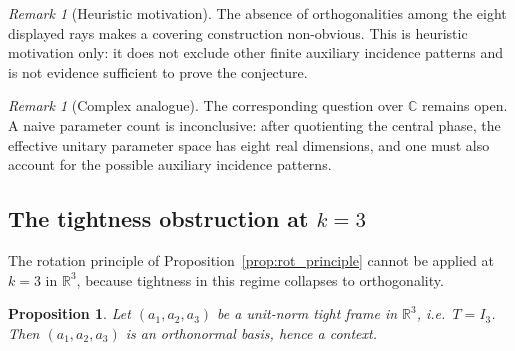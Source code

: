 \documentclass[
  twocolumn,
  aps,
  pra,
  floatfix,
  amsmath,amssymb,
  longbibliography
]{revtex4-2}
\newtheorem{proposition}[theorem]{Proposition}
\theoremstyle{definition}
\theoremstyle{remark}
\newtheorem{remark}[theorem]{Remark}
\begin{document}
\begin{remark}[Heuristic motivation]

The absence of orthogonalities among the eight displayed rays makes a
covering construction non-obvious.  This is heuristic motivation only:
it does not exclude other finite auxiliary incidence patterns and is not
evidence sufficient to prove the conjecture.
\end{remark}

\begin{remark}[Complex analogue]
The corresponding question over $\mathbb C$ remains open.  A naive
parameter count is inconclusive: after quotienting the central phase,
the effective unitary parameter space has eight real dimensions, and
one must also account for the possible auxiliary incidence patterns.
\end{remark}

\subsection{The tightness obstruction at \texorpdfstring{$k=3$}{k=3}}

The rotation principle of Proposition~\ref{prop:rot_principle}
cannot be applied at $k=3$ in $\mathbb{R}^3$, because tightness in
this regime collapses to orthogonality.

\begin{proposition}\label{prop:k3_obstruction}
Let $(a_1,a_2,a_3)$ be a unit-norm tight frame in $\mathbb{R}^3$,
i.e.\ $T=I_3$.  Then $(a_1,a_2,a_3)$ is an orthonormal basis,
hence a context.
\end{proposition}
\end{document}
